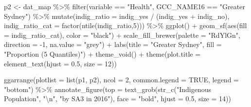 \documentclass[
  letterpaper,
  DIV=11,
  numbers=noendperiod]{scrartcl}
\newenvironment{Shaded}{\begin{snugshade}}{\end{snugshade}}
\newcommand{\AttributeTok}[1]{\textcolor[rgb]{0.40,0.45,0.13}{#1}}
\newcommand{\ConstantTok}[1]{\textcolor[rgb]{0.56,0.35,0.01}{#1}}
\newcommand{\DecValTok}[1]{\textcolor[rgb]{0.68,0.00,0.00}{#1}}
\newcommand{\FloatTok}[1]{\textcolor[rgb]{0.68,0.00,0.00}{#1}}
\newcommand{\FunctionTok}[1]{\textcolor[rgb]{0.28,0.35,0.67}{#1}}
\newcommand{\NormalTok}[1]{\textcolor[rgb]{0.00,0.23,0.31}{#1}}
\newcommand{\OtherTok}[1]{\textcolor[rgb]{0.00,0.23,0.31}{#1}}
\newcommand{\SpecialCharTok}[1]{\textcolor[rgb]{0.37,0.37,0.37}{#1}}
\newcommand{\StringTok}[1]{\textcolor[rgb]{0.13,0.47,0.30}{#1}}
\begin{document}
\begin{Shaded}
\begin{Highlighting}[]
\NormalTok{p2 }\OtherTok{\textless{}{-}}\NormalTok{ dat\_map }\SpecialCharTok{\%\textgreater{}\%}
  \FunctionTok{filter}\NormalTok{(variable }\SpecialCharTok{==} \StringTok{"Health"}\NormalTok{,}
\NormalTok{         GCC\_NAME16 }\SpecialCharTok{==} \StringTok{"Greater Sydney"}\NormalTok{) }\SpecialCharTok{\%\textgreater{}\%}
  \FunctionTok{mutate}\NormalTok{(}\AttributeTok{indig\_ratio =}\NormalTok{ indig\_yes }\SpecialCharTok{/}\NormalTok{ (indig\_yes }\SpecialCharTok{+}\NormalTok{ indig\_no),}
         \AttributeTok{indig\_ratio\_cat =} \FunctionTok{factor}\NormalTok{(}\FunctionTok{ntile}\NormalTok{(indig\_ratio,}\DecValTok{5}\NormalTok{))) }\SpecialCharTok{\%\textgreater{}\%}
  \FunctionTok{ggplot}\NormalTok{() }\SpecialCharTok{+}
  \FunctionTok{geom\_sf}\NormalTok{(}\FunctionTok{aes}\NormalTok{(}\AttributeTok{fill =}\NormalTok{ indig\_ratio\_cat),}
          \AttributeTok{color =} \StringTok{"black"}\NormalTok{) }\SpecialCharTok{+}
  \FunctionTok{scale\_fill\_brewer}\NormalTok{(}\AttributeTok{palette =} \StringTok{"RdYlGn"}\NormalTok{,}
                    \AttributeTok{direction =} \SpecialCharTok{{-}}\DecValTok{1}\NormalTok{,}
                    \AttributeTok{na.value =} \StringTok{"grey"}\NormalTok{) }\SpecialCharTok{+} 
  \FunctionTok{labs}\NormalTok{(}\AttributeTok{title =} \StringTok{"Greater Sydney"}\NormalTok{,}
       \AttributeTok{fill =} \StringTok{"Proportion (5 Quantiles)"}\NormalTok{) }\SpecialCharTok{+}
  \FunctionTok{theme\_void}\NormalTok{() }\SpecialCharTok{+}
  \FunctionTok{theme}\NormalTok{(}\AttributeTok{plot.title =} \FunctionTok{element\_text}\NormalTok{(}\AttributeTok{hjust =} \FloatTok{0.5}\NormalTok{,}
                                  \AttributeTok{size =} \DecValTok{12}\NormalTok{))}

\FunctionTok{ggarrange}\NormalTok{(}\AttributeTok{plotlist =} \FunctionTok{list}\NormalTok{(p1, p2),}
          \AttributeTok{ncol =} \DecValTok{2}\NormalTok{,}
          \AttributeTok{common.legend =} \ConstantTok{TRUE}\NormalTok{, }\AttributeTok{legend =} \StringTok{"bottom"}\NormalTok{) }\SpecialCharTok{\%\textgreater{}\%}
  \FunctionTok{annotate\_figure}\NormalTok{(}\AttributeTok{top =} \FunctionTok{text\_grob}\NormalTok{(}\FunctionTok{str\_c}\NormalTok{(}\StringTok{"Indigenous Population"}\NormalTok{,}
                                        \StringTok{"}\SpecialCharTok{\textbackslash{}n}\StringTok{"}\NormalTok{,  }\StringTok{"by SA3 in 2016"}\NormalTok{), }
                                  \AttributeTok{face =} \StringTok{"bold"}\NormalTok{,}
                                  \AttributeTok{hjust =} \FloatTok{0.5}\NormalTok{,}
                                  \AttributeTok{size =} \DecValTok{14}\NormalTok{))}
\end{Highlighting}
\end{Shaded}
\end{document}
